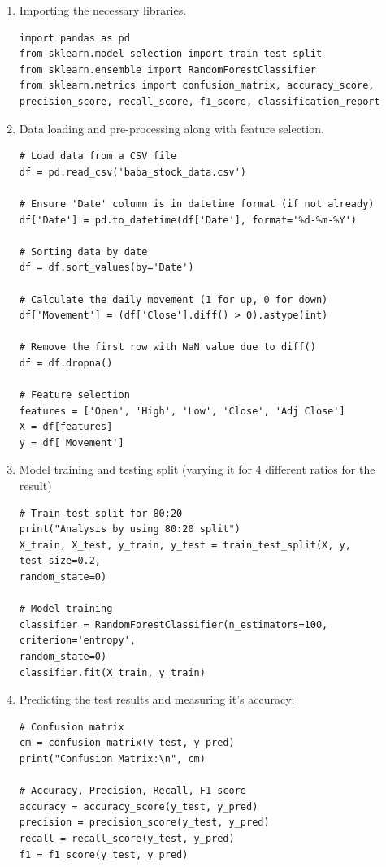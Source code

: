 \documentclass[12pt,a4paper]{report}
\begin{document}
\begin{enumerate}
    \item Importing the necessary libraries.
    \begin{verbatim}
import pandas as pd
from sklearn.model_selection import train_test_split
from sklearn.ensemble import RandomForestClassifier
from sklearn.metrics import confusion_matrix, accuracy_score,
precision_score, recall_score, f1_score, classification_report
    \end{verbatim}
    \item Data loading and pre-processing along with feature selection.
    \begin{verbatim}
# Load data from a CSV file
df = pd.read_csv('baba_stock_data.csv')

# Ensure 'Date' column is in datetime format (if not already)
df['Date'] = pd.to_datetime(df['Date'], format='%d-%m-%Y')

# Sorting data by date
df = df.sort_values(by='Date')

# Calculate the daily movement (1 for up, 0 for down)
df['Movement'] = (df['Close'].diff() > 0).astype(int)

# Remove the first row with NaN value due to diff()
df = df.dropna()

# Feature selection
features = ['Open', 'High', 'Low', 'Close', 'Adj Close']
X = df[features]
y = df['Movement']
    \end{verbatim}
    \item Model training and testing split (varying it for 4 different ratios for the result)
    \begin{verbatim}
# Train-test split for 80:20
print("Analysis by using 80:20 split")
X_train, X_test, y_train, y_test = train_test_split(X, y, test_size=0.2, 
random_state=0)

# Model training
classifier = RandomForestClassifier(n_estimators=100, criterion='entropy', 
random_state=0)
classifier.fit(X_train, y_train)
    \end{verbatim}
    \item Predicting the test results and measuring it’s accuracy:
    \begin{verbatim}
# Confusion matrix
cm = confusion_matrix(y_test, y_pred)
print("Confusion Matrix:\n", cm)

# Accuracy, Precision, Recall, F1-score
accuracy = accuracy_score(y_test, y_pred)
precision = precision_score(y_test, y_pred)
recall = recall_score(y_test, y_pred)
f1 = f1_score(y_test, y_pred)


\end{verbatim}
\end{enumerate}
\end{document}
